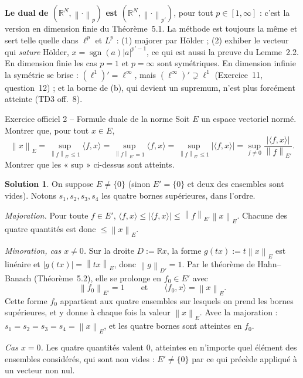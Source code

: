 \documentclass[11pt,a4paper]{article}
\newcommand{\R}{\mathbb{R}}
\newcommand{\norm}[1]{\left\|#1\right\|}
\DeclareMathOperator{\sgn}{sgn}
\theoremstyle{definition}
\newtheorem*{solution}{Solution}
\begin{document}
\begin{pointcle}
\textbf{Le dual de $(\R^N,\norm\cdot_p)$ est $(\R^N,\norm\cdot_{p'})$}, pour tout $p\in[1,\infty]$ : c'est la version en dimension finie du Théorème~5.1. La méthode est toujours la même et sert telle quelle dans $\ell^p$ et $L^p$ : (1) majorer par Hölder ; (2) exhiber le vecteur qui \emph{sature} Hölder, $x=\sgn(a)|a|^{p'-1}$, ce qui est aussi la preuve du Lemme~2.2. En dimension finie les cas $p=1$ et $p=\infty$ sont symétriques. En dimension infinie la symétrie se brise : $(\ell^1)'=\ell^\infty$, mais $(\ell^\infty)'\supsetneq\ell^1$ (Exercice~11, question~12) ; et la borne de (b), qui devient un supremum, n'est plus forcément atteinte (TD3 off.~8).
\end{pointcle}

\begin{exo}{Exercice officiel 2 -- Formule duale de la norme}
Soit $E$ un espace vectoriel normé. Montrer que, pour tout $x\in E$,
\[
\norm x_E=\sup_{\norm f_{E'}\le1}\langle f,x\rangle=\sup_{\norm f_{E'}=1}\langle f,x\rangle=\sup_{\norm f_{E'}\le1}|\langle f,x\rangle|=\sup_{f\ne0}\frac{|\langle f,x\rangle|}{\norm f_{E'}} .
\]
Montrer que les « sup » ci-dessus sont atteints.
\end{exo}

\begin{solution}
On suppose $E\ne\{0\}$ (sinon $E'=\{0\}$ et deux des ensembles sont vides). Notons $s_1,s_2,s_3,s_4$ les quatre bornes supérieures, dans l'ordre.

\emph{Majoration.} Pour toute $f\in E'$, $\langle f,x\rangle\le|\langle f,x\rangle|\le\norm f_{E'}\norm x_E$. Chacune des quatre quantités est donc $\le\norm x_E$.

\emph{Minoration, cas $x\ne0$.} Sur la droite $D:=\R x$, la forme $g(tx):=t\norm x_E$ est linéaire et $|g(tx)|=\norm{tx}_E$, donc $\norm g_{D'}=1$. Par le théorème de Hahn--Banach (Théorème~5.2), elle se prolonge en $f_0\in E'$ avec
\[
\norm{f_0}_{E'}=1\qquad\text{et}\qquad\langle f_0,x\rangle=\norm x_E .
\]
Cette forme $f_0$ appartient aux quatre ensembles sur lesquels on prend les bornes supérieures, et y donne à chaque fois la valeur $\norm x_E$. Avec la majoration : $s_1=s_2=s_3=s_4=\norm x_E$, et les quatre bornes sont atteintes en $f_0$.

\emph{Cas $x=0$.} Les quatre quantités valent $0$, atteintes en n'importe quel élément des ensembles considérés, qui sont non vides : $E'\ne\{0\}$ par ce qui précède appliqué à un vecteur non nul.
\end{solution}
\end{document}
